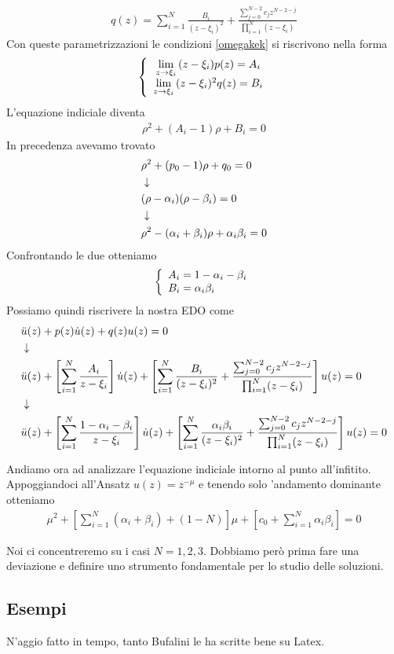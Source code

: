 \begin{align}
	q(z) = \sum_{i=1}^{N} \frac{B_i}{(z-\xi_i)^2} +  \frac{\sum_{j=0}^{N-2} c_j z^{N-2-j} }{\prod_{i=1}^{N}(z-\xi_i)}
\end{align}
Con queste parametrizzazioni le condizioni \ref{omegakek} si riscrivono nella forma
\begin{align}
	\left\{ \begin{array}{cc} \underset{z \rightarrow \xi_i}{\lim} \, (z-\xi_i)p(z) = A_i\\ \underset{z \rightarrow \xi_i}{\lim} \, (z-\xi_i)^2 q(z)= B_i \end{array} \right.
\end{align}
L'equazione indiciale diventa
\begin{align}
	\rho^2 + (A_i -1)\rho + B_i = 0
\end{align}
In precedenza avevamo trovato
\begin{align}
	&\rho^2 + (p_0 -1)\rho + q_0 = 0 \\ &\downarrow \nonumber \\
	&(\rho- \alpha_i)(\rho- \beta_i) = 0 \nonumber \\ &\downarrow \nonumber \\
	&\rho^2 - (\alpha_i + \beta_i) \rho +\alpha_i\beta_i = 0
\end{align}
Confrontando le due otteniamo
\begin{align}
	\double{ A_i =  1 - \alpha_i - \beta_i}{B_i = \alpha_i\beta_i \hfill}
\end{align}
Possiamo quindi riscrivere la nostra EDO come
\begin{align}
	&\ddot{u}(z) + p(z)\dot{u}(z) + q(z)u(z) = 0\\ &\downarrow \nonumber \\
	&\ddot{u}(z) + \left[ \sum_{i=1}^{N} \frac{A_i}{z-\xi_i} \right] \dot{u}(z) + \left[ \sum_{i=1}^{N} \frac{B_i}{(z-\xi_i)^2} +  \frac{\sum_{j=0}^{N-2} c_j z^{N-2-j} }{\prod_{i=1}^{N}(z-\xi_i)} \right] u(z) = 0\nonumber \\ &\downarrow \nonumber \\
	&\ddot{u}(z) + \left[ \sum_{i=1}^{N} \frac{1 - \alpha_i - \beta_i}{z-\xi_i} \right] \dot{u}(z) + \left[ \sum_{i=1}^{N} \frac{\alpha_i\beta_i}{(z-\xi_i)^2} +  \frac{\sum_{j=0}^{N-2} c_j z^{N-2-j} }{\prod_{i=1}^{N}(z-\xi_i)} \right] u(z) = 0
\end{align}

Andiamo ora ad analizzare l'equazione indiciale intorno al punto all'infitito. Appoggiandoci all'Ansatz $u(z) = z^{-\mu}$ e tenendo solo 'andamento dominante otteniamo
\begin{align}
	\mu^2 + \left[ \sum_{i=1}^{N} (\alpha_i + \beta_i) + (1-N) \right]\mu + \left[ c_0 + \sum_{i=1}^{N}\alpha_i \beta_i \right] = 0
\end{align}

Noi ci concentreremo su i casi $N=1,2,3$. Dobbiamo però prima fare una deviazione e definire uno strumento fondamentale per lo studio delle soluzioni.



\newpage
\subsection{Esempi}
N'aggio fatto in tempo, tanto Bufalini le ha scritte bene su Latex.